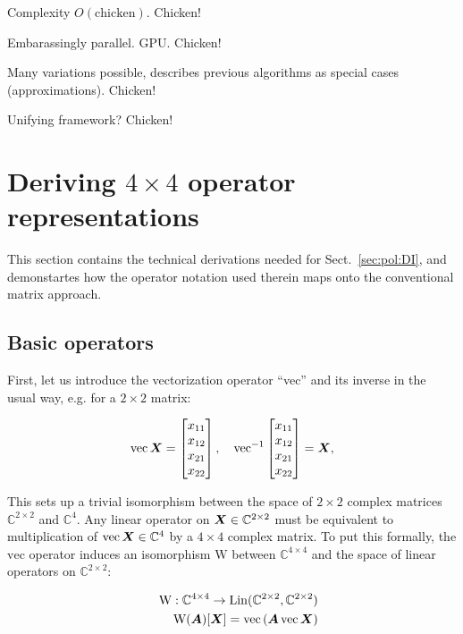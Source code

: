 \documentclass[useAMS,usenatbib]{mn2e}
\newcommand{\COMPLEX}{\mathbb{C}}
\newcommand{\mat}[1]{{\bmath{#1}}}
\begin{document}
Complexity $O(\mathrm{chicken}).$ Chicken!

Embarassingly parallel. GPU. Chicken!

Many variations possible, describes previous algorithms as special cases (approximations). Chicken!

Unifying framework? Chicken!




\appendix

\section{Deriving $4\times4$ operator representations}
\label{sec:4x4app}

This section contains the technical derivations needed for Sect.~\ref{sec:pol:DI}, and demonstartes how the
operator notation used therein maps onto the conventional matrix approach.

\subsection{Basic operators}

First, let us introduce the vectorization operator ``vec'' and its inverse in the usual way, e.g. for a $2\times2$ matrix:

\newcommand{\VEC}[1]{\mathrm{vec}\,{#1}}
\newcommand{\VECINV}[1]{\mathrm{vec}^{-1}\,{#1}}

\[
\VEC{\mat{X}} = \Matrix{c}{x_{11}\\x_{12}\\x_{21}\\x_{22}},~~~
\VECINV{\Matrix{c}{x_{11}\\x_{12}\\x_{21}\\x_{22}}} = \mat{X},
\]

This sets up a trivial isomorphism between the space of $2\times2$ complex matrices $\COMPLEX^{2\times2}$ and $\COMPLEX^4$. 
Any linear operator on $\mat{X} \in \COMPLEX^{2\times2}$ must be equivalent to multiplication of $\VEC{\mat{X}} \in \COMPLEX^4$ by 
a $4\times 4$ complex matrix. To put this formally, the $\mathrm{vec}$ operator induces an isomorphism 
$\mathrm{W}$ between $\COMPLEX^{4\times4}$ and the space of linear operators on $\COMPLEX^{2\times2}$:

\begin{eqnarray}
&& \mathrm{W}:\COMPLEX^{4\times4}\to\mathrm{Lin}(\COMPLEX^{2\times2},\COMPLEX^{2\times2}) \nonumber\\
&& \mathrm{W}(\mat{A})[\mat{X}] = \VEC{(\mat{A}\,\VEC{\mat{X}})} \label{eq:iso:W}
\end{eqnarray}
\end{document}
